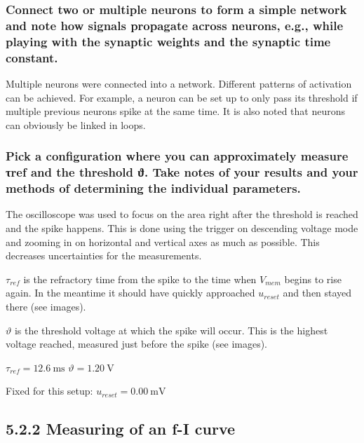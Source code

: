 \documentclass[a4paper, 11pt]{scrartcl}
\begin{document}
\subsubsection{Connect two or multiple neurons to form a simple network and note how signals propagate across neurons, e.g.,
while playing with the synaptic weights and the synaptic time constant.}

Multiple neurons were connected into a network.
Different patterns of activation can be achieved.
For example, a neuron can be set up to only pass its threshold if multiple previous neurons spike at the same time.
It is also noted that neurons can obviously be linked in loops.



\subsubsection{Pick a configuration where you can approximately measure τref and the threshold ϑ. Take notes of your results and
your methods of determining the individual parameters.}

The oscilloscope was used to focus on the area right after the threshold is reached and the spike happens.
This is done using the trigger on descending voltage mode and zooming in on horizontal and vertical axes as much as possible.
This decreases uncertainties for the measurements.

\( \tau_{ref} \) is the refractory time from the spike to the time when \( V_{mem} \) begins to rise again. In the meantime it should have quickly approached \( u_{reset} \) and then stayed there (see images).

\( \vartheta \) is the threshold voltage at which the spike will occur. This is the highest voltage reached, measured just before the spike (see images).

\( \tau_{ref} = \qty{12.6}{\milli \second}  \)
\( \vartheta = \qty{1.20}{\volt} \)


Fixed for this setup:
\( u_{reset} = \qty{0.00}{\milli \volt} \)

\subsection{5.2.2 Measuring of an f-I curve}
\end{document}
